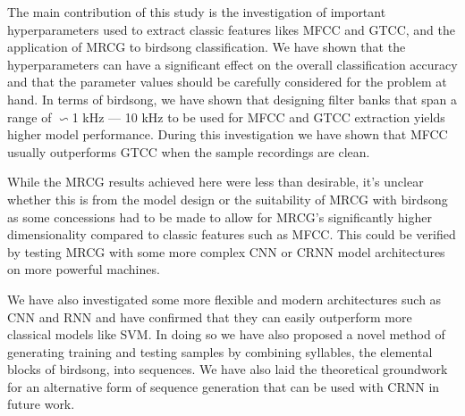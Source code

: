 The main contribution of this study is the investigation of important
hyperparameters used to extract classic features likes MFCC and GTCC, and the
application of MRCG to birdsong classification. We have shown that the
hyperparameters can have a significant effect on the overall classification
accuracy and that the parameter values should be carefully considered for the
problem at hand. In terms of birdsong, we have shown that designing filter banks
that span a range of $\backsim$1 kHz --- 10 kHz to be used for MFCC and GTCC
extraction yields higher model performance. During this investigation we have
shown that MFCC usually outperforms GTCC when the sample recordings are clean.

While the MRCG results achieved here were less than desirable, it's unclear
whether this is from the model design or the suitability of MRCG with birdsong
as some concessions had to be made to allow for MRCG's significantly higher
dimensionality compared to classic features such as MFCC\@. This could be
verified by testing MRCG with some more complex CNN or CRNN model architectures
on more powerful machines.

We have also investigated some more flexible and modern architectures such as CNN
and RNN and have confirmed that they can easily outperform more classical models
like SVM\@. In doing so we have also proposed a novel method of generating
training and testing samples by combining syllables, the elemental blocks of
birdsong, into sequences. We have also laid the theoretical groundwork for an
alternative form of sequence generation that can be used with CRNN in future work.
